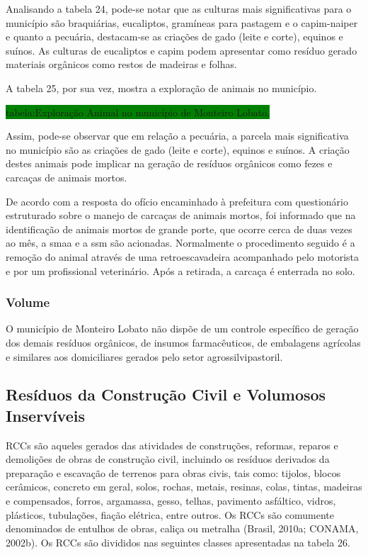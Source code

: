 	Analisando a tabela 24, pode-se notar que as culturas mais significativas para o município são braquiárias, eucaliptos, gramíneas para pastagem e o capim-naiper e quanto a pecuária, destacam-se as criações de gado (leite e corte), equinos e suínos. As culturas de eucaliptos e capim podem apresentar como resíduo gerado materiais orgânicos como restos de madeiras e folhas.
	
	A tabela 25, por sua vez, mostra a exploração de animais no município.
	
	\colorbox{green}{tabela:Exploração Animal no município de Monteiro Lobato.}
	
	Assim, pode-se observar que em relação a pecuária, a parcela mais significativa no município são as criações de gado (leite e corte), equinos e suínos. A criação destes animais pode implicar na geração de resíduos orgânicos como fezes e carcaças de animais mortos.
	
	De acordo com a resposta do ofício encaminhado à prefeitura com questionário estruturado sobre o manejo de carcaças de animais mortos, foi informado que na identificação de animais mortos de grande porte, que ocorre cerca de duas vezes ao mês, a \gls{smaa} e a \gls{ssm} são acionadas. Normalmente o procedimento seguido é a remoção do animal através de uma retroescavadeira acompanhado pelo motorista e por um profissional veterinário. Após a retirada, a carcaça é enterrada no solo.
	
	\subsubsection{Volume}
	O município de Monteiro Lobato não dispõe de um controle específico de geração dos demais resíduos orgânicos, de insumos farmacêuticos, de embalagens agrícolas e similares aos domiciliares gerados pelo setor agrossilvipastoril.
	
	\subsection{Resíduos da Construção Civil e Volumosos Inservíveis}
	RCCs são aqueles gerados das atividades de construções, reformas, reparos e demolições de obras de construção civil, incluindo os resíduos derivados da preparação e escavação de terrenos para obras civis, tais como: tijolos, blocos cerâmicos, concreto em geral, solos, rochas, metais, resinas, colas, tintas, madeiras e compensados, forros, argamassa, gesso, telhas, pavimento asfáltico, vidros, plásticos, tubulações, fiação elétrica, entre outros. Os RCCs são comumente denominados de entulhos de obras, caliça ou metralha (Brasil, 2010a; CONAMA, 2002b). Os RCCs são divididos nas seguintes classes apresentadas na tabela 26.
	

